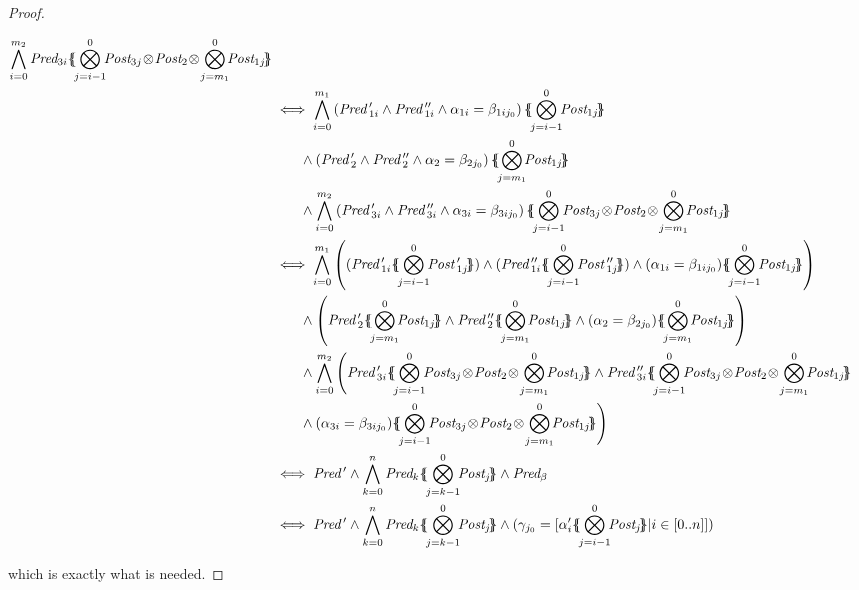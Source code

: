 \documentclass{lmcs}
\newcommand{\shortotimes}{\!\otimes\!}
\begin{document}
\begin{proof}
\begin{scriptsize}
\begin{equation*}
\begin{split}
\bigwedge_{i=0}^{m_2}\Pred_{3i}\subst{\bigotimes_{j=i-1}^{0}\!\!\Post_{3j}\shortotimes\Post_2\shortotimes\bigotimes_{j=m_1}^{0}\!\!\Post_{1j}}\\
&\iff\bigwedge_{i=0}^{m_1}\left(\Pred\,'_{1i}
		\land {\Pred\,''_{1i}}\land \alpha_{1i}=\beta_{1ij_0}\right)\subst{\bigotimes_{j=i-1}^{0}\!\!\Post_{1j}} \\
&\qquad\land\left(\Pred\,'_{2}
		\land {\Pred\,''_{2}}\land \alpha_{2}=\beta_{2j_0}\right)\subst{\bigotimes_{j=m_1}^{0}\!\!\Post_{1j}}\\
&\qquad\land\bigwedge_{i=0}^{m_2} \left(\Pred\,'_{3i}
		\land {\Pred\,''_{3i}}\land \alpha_{3i}=\beta_{3ij_0}\right) \subst{\bigotimes_{j=i-1}^{0}\!\!\Post_{3j}\shortotimes\Post_2\shortotimes\bigotimes_{j=m_1}^{0}\!\!\Post_{1j}}\\
&\iff\bigwedge_{i=0}^{m_1}\left((\Pred\,'_{1i}\subst{\bigotimes_{j=i-1}^{0}\!\!\Post\,'_{1j}})
		\land ({\Pred\,''_{1i}}\subst{\bigotimes_{j=i-1}^{0}\!\!\Post\,''_{1j}})\land (\alpha_{1i}=\beta_{1ij_0})\subst{\bigotimes_{j=i-1}^{0}\!\!\Post_{1j}}\right) \\
&\qquad\land \left(\Pred\,'_{2}\subst{\bigotimes_{j=m_1}^{0}\!\!\Post_{1j}}
		\land {\Pred\,''_{2}} \subst{\bigotimes_{j=m_1}^{0}\!\!\Post_{1j}} \land (\alpha_{2}=\beta_{2j_0})\subst{\bigotimes_{j=m_1}^{0}\!\!\Post_{1j}} \right) \\
&\qquad\land\bigwedge_{i=0}^{m_2} \Bigg(\Pred\,'_{3i} \subst{\bigotimes_{j=i-1}^{0}\!\!\Post_{3j}\shortotimes\Post_2\shortotimes\bigotimes_{j=m_1}^{0}\!\!\Post_{1j}} 
		\land {\Pred\,''_{3i}} \subst{\bigotimes_{j=i-1}^{0}\!\!\Post_{3j}\shortotimes\Post_2\shortotimes\bigotimes_{j=m_1}^{0}\!\!\Post_{1j}}  \\
		 & \qquad \land (\alpha_{3i}=\beta_{3ij_0}) \subst{\bigotimes_{j=i-1}^{0}\!\!\Post_{3j}\shortotimes\Post_2\shortotimes\bigotimes_{j=m_1}^{0}\!\!\Post_{1j}}\Bigg)  \\
&\iff \Pred\,'\land\bigwedge_{k=0}^n\Pred_k\subst{\bigotimes_{j=k-1}^{0}\!\!\Post_{j}}\land\Pred_\beta
\\&\iff \Pred\,'\land\bigwedge_{k=0}^n\Pred_k\subst{\bigotimes_{j=k-1}^{0}\!\!\Post_{j}}\land
(\gamma_{j_0}=[\alpha'_{i}\subst{\bigotimes_{j=i-1}^{0}\!\!\Post_{j}}|i\in[0..n]])
\end{split}\end{equation*}
\end{scriptsize}
which is exactly what is needed.


\end{proof}
\end{document}
